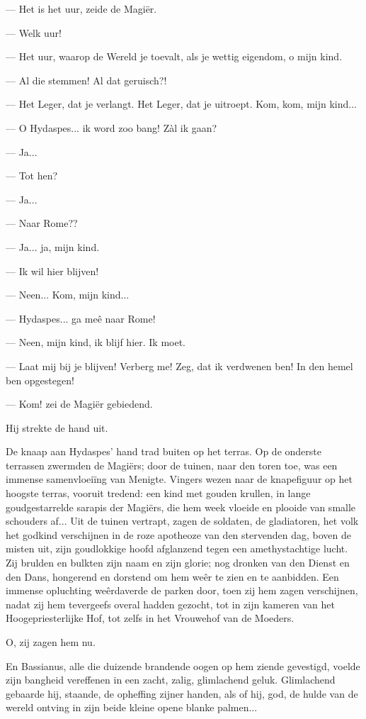 \documentclass[a4paper, 12pt, oneside, dutch]{article}
\begin{document}
--- Het is het uur, zeide de Magiër.

--- Welk uur!

--- Het uur, waarop de Wereld je toevalt, als je wettig eigendom, o mijn kind.

--- Al die stemmen! Al dat geruisch?!

--- Het Leger, dat je verlangt. Het Leger, dat je uitroept. Kom, kom, mijn kind...

--- O Hydaspes... ik word zoo bang! Zàl ik gaan?

--- Ja...

--- Tot hen?

--- Ja...

--- Naar Rome??

--- Ja... ja, mijn kind.

--- Ik wil hier blijven!

--- Neen... Kom, mijn kind...

--- Hydaspes... ga meê naar Rome!

--- Neen, mijn kind, ik blijf hier. Ik moet.

--- Laat mij bij je blijven! Verberg me! Zeg, dat ik verdwenen ben! In den hemel ben opgestegen!

--- Kom! zei de Magiër gebiedend.

Hij strekte de hand uit.

De knaap aan Hydaspes' hand trad buiten op het terras. Op de onderste terrassen zwermden de Magiërs; door de tuinen, naar den toren toe, was een immense samenvloeiïng van Menigte. Vingers wezen naar de knapefiguur op het hoogste terras, vooruit tredend: een kind met gouden krullen, in lange goudgestarrelde sarapis der Magiërs, die hem week vloeide en plooide van smalle schouders af... Uit de tuinen vertrapt, zagen de soldaten, de gladiatoren, het volk het godkind verschijnen in de roze apotheoze van den stervenden dag, boven de misten uit, zijn goudlokkige hoofd afglanzend tegen een amethystachtige lucht. Zij brulden en bulkten zijn naam en zijn glorie; nog dronken van den Dienst en den Dans, hongerend en dorstend om hem weêr te zien en te aanbidden. Een immense opluchting weêrdaverde de parken door, toen zij hem zagen verschijnen, nadat zij hem tevergeefs overal hadden gezocht, tot in zijn kameren van het Hoogepriesterlijke Hof, tot zelfs in het Vrouwehof van de Moeders.

O, zij zagen hem nu.

En Bassianus, alle die duizende brandende oogen op hem ziende gevestigd, voelde zijn bangheid vereffenen in een zacht, zalig, glimlachend geluk. Glimlachend gebaarde hij, staande, de opheffing zijner handen, als of hij, god, de hulde van de wereld ontving in zijn beide kleine opene blanke palmen...
\end{document}
